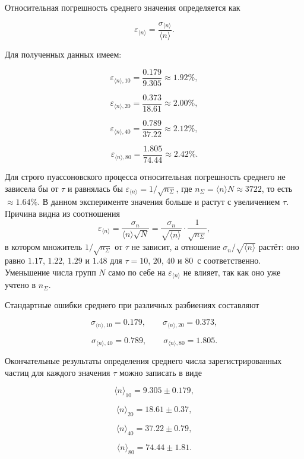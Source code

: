 \documentclass[12pt,a4paper]{article}
\begin{document}
Относительная погрешность среднего значения определяется как

\begin{equation}
    \varepsilon_{\langle n\rangle}
    =
    \frac{\sigma_{\langle n\rangle}}
    {\langle n\rangle}.
    \label{eq:relative_mean_error}
\end{equation}

Для полученных данных имеем:

\[
\varepsilon_{\langle n\rangle,10}
=
\frac{0.179}{9.305}
\approx 1.92\%,
\]

\[
\varepsilon_{\langle n\rangle,20}
=
\frac{0.373}{18.61}
\approx 2.00\%,
\]

\[
\varepsilon_{\langle n\rangle,40}
=
\frac{0.789}{37.22}
\approx 2.12\%,
\]

\[
\varepsilon_{\langle n\rangle,80}
=
\frac{1.805}{74.44}
\approx 2.42\%.
\]

Для строго пуассоновского процесса относительная погрешность среднего не зависела бы от $\tau$ и равнялась бы $\varepsilon_{\langle n\rangle}=1/\sqrt{n_\Sigma}$, где $n_\Sigma=\langle n\rangle N\approx3722$, то есть $\approx1.64\%$. В данном эксперименте значения больше и растут с увеличением $\tau$. Причина видна из соотношения
\[
\varepsilon_{\langle n\rangle}
=\frac{\sigma_n}{\langle n\rangle\sqrt{N}}
=\frac{\sigma_n}{\sqrt{\langle n\rangle}}\cdot\frac{1}{\sqrt{n_\Sigma}},
\]
в котором множитель $1/\sqrt{n_\Sigma}$ от $\tau$ не зависит, а отношение $\sigma_n/\sqrt{\langle n\rangle}$ растёт: оно равно $1.17$, $1.22$, $1.29$ и $1.48$ для $\tau=10$, $20$, $40$ и $80$~с соответственно. Уменьшение числа групп $N$ само по себе на $\varepsilon_{\langle n\rangle}$ не влияет, так как оно уже учтено в $n_\Sigma$.

Стандартные ошибки среднего при различных разбиениях составляют

\[
\sigma_{\langle n\rangle,10}=0.179,
\qquad
\sigma_{\langle n\rangle,20}=0.373,
\]

\[
\sigma_{\langle n\rangle,40}=0.789,
\qquad
\sigma_{\langle n\rangle,80}=1.805.
\]

Окончательные результаты определения среднего числа зарегистрированных частиц для каждого значения $\tau$ можно записать в виде

\[
\langle n\rangle_{10}=9.305\pm0.179,
\]

\[
\langle n\rangle_{20}=18.61\pm0.37,
\]

\[
\langle n\rangle_{40}=37.22\pm0.79,
\]

\[
\langle n\rangle_{80}=74.44\pm1.81.
\]
\end{document}
